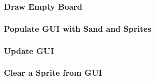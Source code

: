     \subsubsection{Draw Empty Board}
    
    \subsubsection{Populate GUI with Sand and Sprites}

    \subsubsection{Update GUI}

    \subsubsection{Clear a Sprite from GUI}




